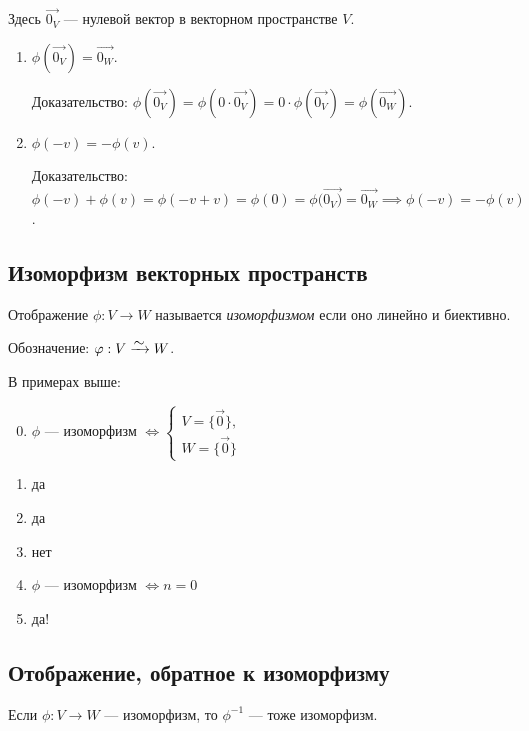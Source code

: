 Здесь $\overrightarrow{0_V}$ --- нулевой вектор в векторном пространстве $V$.

\begin{enumerate}
\item $\phi(\overrightarrow{0_V}) = \overrightarrow{0_W}$.

    Доказательство: $\phi(\overrightarrow{0_V}) = \phi(0 \cdot \overrightarrow{0_V}) = 0 \cdot \phi(\overrightarrow{0_V}) = \phi(\overrightarrow{0_W})$.

\item $\phi(-v) = -\phi(v)$.

    Доказательство: $\phi(-v) + \phi(v) = \phi(-v + v) = \phi(0) = \phi(\overrightarrow{0_V)} = \overrightarrow{0_W} \implies \phi(-v) = -\phi(v)$.
\end{enumerate}


\subsection{Изоморфизм векторных пространств}

\begin{definition}
    Отображение $\phi : V \to W$ называется \textit{изоморфизмом} если оно линейно и биективно.

    Обозначение: $\phi : V \MapsTo W$.
\end{definition}

В примерах выше:
\begin{enumerate}[nosep]
\setcounter{enumi}{-1}
\item $\phi$ --- изоморфизм $\iff \begin{cases}
    V = \{\overrightarrow{0}\}, \\
    W = \{\overrightarrow{0}\}
\end{cases}$

\item да
\item да
\item нет
\item $\phi$ --- изоморфизм $\iff n = 0$
\item да!
\end{enumerate}


\subsection{Отображение, обратное к изоморфизму}

\begin{proposal}
    \label{lec16:prop_1}
    Если $\phi : V \to W$ --- изоморфизм, то $\phi^{-1}$ --- тоже изоморфизм. 
\end{proposal}

